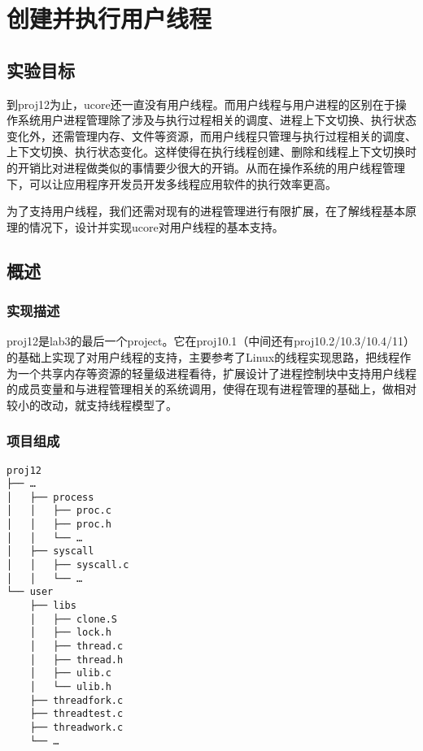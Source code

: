 \section{创建并执行用户线程}\label{ux521bux5efaux5e76ux6267ux884cux7528ux6237ux7ebfux7a0b}

\subsection{实验目标}\label{ux5b9eux9a8cux76eeux6807}

到proj12为止，ucore还一直没有用户线程。而用户线程与用户进程的区别在于操作系统用户进程管理除了涉及与执行过程相关的调度、进程上下文切换、执行状态变化外，还需管理内存、文件等资源，而用户线程只管理与执行过程相关的调度、上下文切换、执行状态变化。这样使得在执行线程创建、删除和线程上下文切换时的开销比对进程做类似的事情要少很大的开销。从而在操作系统的用户线程管理下，可以让应用程序开发员开发多线程应用软件的执行效率更高。

为了支持用户线程，我们还需对现有的进程管理进行有限扩展，在了解线程基本原理的情况下，设计并实现ucore对用户线程的基本支持。

\subsection{概述}\label{ux6982ux8ff0}

\subsubsection{实现描述}\label{ux5b9eux73b0ux63cfux8ff0}

proj12是lab3的最后一个project。它在proj10.1（中间还有proj10.2/10.3/10.4/11）的基础上实现了对用户线程的支持，主要参考了Linux的线程实现思路，把线程作为一个共享内存等资源的轻量级进程看待，扩展设计了进程控制块中支持用户线程的成员变量和与进程管理相关的系统调用，使得在现有进程管理的基础上，做相对较小的改动，就支持线程模型了。

\subsubsection{项目组成}\label{ux9879ux76eeux7ec4ux6210}

\begin{lstlisting}
proj12
├── …
│   ├── process
│   │   ├── proc.c
│   │   ├── proc.h
│   │   └── …
│   ├── syscall
│   │   ├── syscall.c
│   │   └── …
└── user
    ├── libs
    │   ├── clone.S
    │   ├── lock.h
    │   ├── thread.c
    │   ├── thread.h
    │   ├── ulib.c
    │   └── ulib.h
    ├── threadfork.c
    ├── threadtest.c
    ├── threadwork.c
    └── …
\end{lstlisting}

